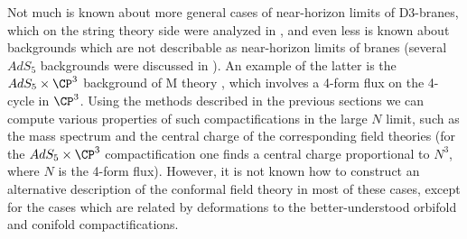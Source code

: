 Not much is known about more general cases of near-horizon limits of
D3-branes, which on the string theory side were analyzed in
\cite{Figueroa-O'Farrill:1998nb,Acharya:1998db,Morrison:1998cs,
Ray:1999qj,Figueroa-O'Farrill:1999va}, and
even less is known about backgrounds which are not describable as
near-horizon limits of branes (several $AdS_5$ backgrounds were discussed
in \cite{Duff:1998us}). An example of the latter is the
$AdS_5\times \CP^3$ background of M theory \cite{Pope:1989xj}, which
involves a 4-form flux on the 4-cycle in $\CP^3$. Using the methods
described in the previous sections we can compute various properties
of such compactifications in the large $N$ limit, such as the mass
spectrum and the central charge of the corresponding field theories
(for the $AdS_5\times \CP^3$ compactification one finds a central
charge proportional to $N^3$, where $N$ is the 4-form flux). However,
it is not known how to construct an alternative description of the
conformal field theory in most of these cases, except for the cases
which are related by deformations to the better-understood orbifold
and conifold compactifications.

